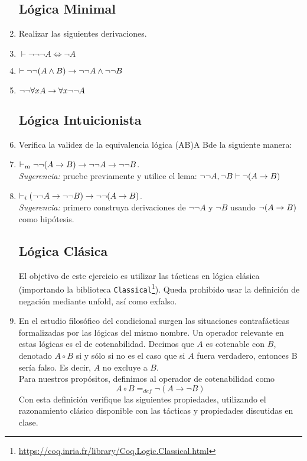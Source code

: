 \documentclass[letterpaper, 11 pt]{article}
\begin{document}
\begin{enumerate}
\subsection*{Lógica Minimal}
\item Realizar las siguientes derivaciones.
  \be
  \item $\vdash \neg\neg\neg A \iff \neg A$
  \item      $\vdash \neg\neg(A\land B)\rightarrow \neg\neg
   A\land\neg\neg B$
  \item $\neg\neg\forall x A\rightarrow \forall x \neg\neg A$
   \ee
   
\subsection*{Lógica Intuicionista}
 \item Verifica la validez de la
   equivalencia lógica \beqs\neg\neg(A\imp B)\iff \neg\neg A\imp\neg\neg
   B\eeqs de la siguiente manera:
   \be
    \item $\vdash_{m} \neg\neg(A\rightarrow B)\rightarrow\neg\neg A\rightarrow\neg\neg
   B$. \\ \emph{Sugerencia:} pruebe previamente y utilice el lema: 
   $\neg\neg A,\neg B\vdash \neg (A\rightarrow B)$
       \item $\vdash_{i}(\neg\neg A\rightarrow\neg\neg
   B)\rightarrow\neg\neg(A\rightarrow B)$. \\ \emph{Sugerencia:} primero construya
   derivaciones de $\neg\neg A$ y $\neg B$ usando $\neg(A\rightarrow B)$ como
   hipótesis.
    \ee

\subsection*{Lógica Clásica}

El objetivo de este ejercicio es utilizar las tácticas en lógica clásica (importando la biblioteca {\tt Classical}\footnote{\url{https://coq.inria.fr/library/Coq.Logic.Classical.html}}). Queda prohibido usar la definición de negación mediante unfold, así como exfalso.

\item En el estudio filosófico del condicional surgen las situaciones
contrafácticas formalizadas por las lógicas del mismo nombre. Un operador
relevante en estas lógicas es el de cotenabilidad. Decimos que $A$ es
cotenable con $B$, denotado $A\circ B$ si y sólo si no es el caso que si $A$
fuera verdadero, entonces B sería falso. Es decir, $A$ no excluye a $B$. \\
Para nuestros propósitos, definimos al operador de cotenabilidad como
\[
A\circ B =_{def} \neg (A\to \neg B)
\] 
Con esta definición verifique las siguientes propiedades, utilizando el razonamiento clásico disponible con las tácticas
y propiedades discutidas en clase.


\end{enumerate}
\end{document}
